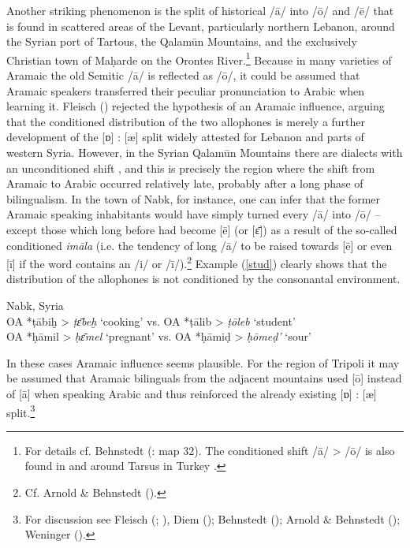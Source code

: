 \documentclass[output=paper]{langsci/langscibook}
\begin{document}
Another striking phenomenon is the split of historical /ā/ into /ō/ and /ē/ that is found in scattered areas of the Levant, particularly northern Lebanon, around the Syrian port of Tartous, the Qalamūn Mountains, and the exclusively Christian town of Maḥarde on the Orontes River.\footnote{For details cf. Behnstedt (\citeyear{Behnstedt1997}: map 32). The conditioned shift /ā/ > /ō/ is also found in and around Tarsus in Turkey \citep[37--38]{Procházka2002Cukurova}.} Because in many varieties of Aramaic the old Semitic /ā/ is reflected as /ō/, it could be assumed that Aramaic speakers transferred their peculiar pronunciation to Arabic when learning it. Fleisch (\citeyear[49]{Fleisch1974vowels}) rejected the hypothesis of an Aramaic influence, arguing that the conditioned distribution of the two allophones is merely a further development of the [ɒ] : [æ] split widely attested for Lebanon and parts of western Syria. However, in the Syrian Qalamūn Mountains there are dialects with an unconditioned shift \citep{Behnstedt1992}, and this is precisely the region where the shift from Aramaic to Arabic occurred relatively late, probably after a long phase of bilingualism. In the town of Nabk, for instance, one can infer that the former Aramaic speaking inhabitants would have simply turned every /ā/ into /ō/ – except those which long before had become [ē] (or [ɛ̄]) as a result of the so-called conditioned \textit{imāla} (i.e. the tendency of long /ā/ to be raised towards [ē] or even [ī] if the word contains an /i/ or /ī/).\footnote{Cf. Arnold \& Behnstedt (\citeyear[68]{ArnoldBehnstedt1993}).} Example (\ref{stud}) clearly shows that the distribution of the allophones is not conditioned by the consonantal environment.

\ea \label{stud}
{Nabk, Syria \citep[20]{Gralla2006}} \\
    \textup{OA} *ṭābiḫ > \textit{ṭɛ̄beḫ}  \textup{‘cooking’ vs. OA} *ṭālib > \textit{ṭōleb}  \textup{‘student’}\\
\textup{OA} *ḥāmil > \textit{ḥɛ̄mel} \textup{‘pregnant’ vs. OA} *ḥāmiḍ > \textit{ḥōmeḍ’} \textup{‘sour’}\\
\z

In these cases Aramaic influence seems plausible. For the region of Tripoli it may be assumed that Aramaic bilinguals from the adjacent mountains used [ō] instead of [ā] when speaking Arabic and thus reinforced the already existing [ɒ] : [æ] split.\footnote{For discussion see Fleisch (\citeyear[48--50]{Fleisch1974vowels}; \citeyear[133--136]{Fleisch1974Kfar}), Diem (\citeyear[45--46]{Diem1979}); Behnstedt (\citeyear{Behnstedt1992}); Arnold \& Behnstedt (\citeyear[67--68]{ArnoldBehnstedt1993}); Weninger (\citeyear[748]{Weninger2011Aramaic}).}
\end{document}
